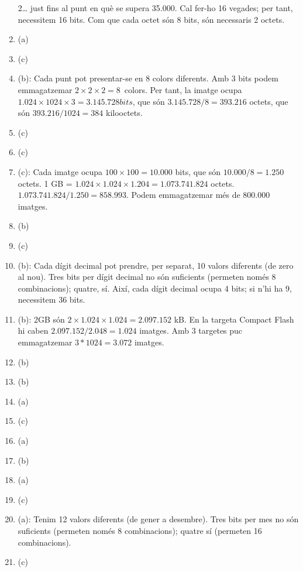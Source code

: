 \begin{enumerate}
  2\times\ldots\) just fins al punt en què se supera 35.000. Cal
  fer-ho 16 vegades; per tant, necessitem 16 bits. Com que cada octet
  són 8 bits, són necessaris 2 octets.
\item (a)
\item (c)
\item (b): Cada punt pot presentar-se en 8 colors diferents. Amb 3
  bits podem emmagatzemar \(2\times2\times2=8\)~colors. Per tant, la
  imatge ocupa $1.024 \times 1024 \times 3 = 3.145.728 bits$, que són
  $3.145.728/8=393.216$ octets, que són $393.216/1024=384$
  kilooctets. 
\item (c)
\item (c)
\item (c): Cada imatge ocupa $100\times100 = 10.000$ bits, que són
  $10.000 / 8 = 1.250$ octets. 1 GB = $1.024 \times 1.024 \times 1.204
  = 1.073.741.824 $ octets. $ 1.073.741.824 / 1.250 = 858.993$. Podem
  emmagatzemar més de 800.000 imatges.
\item (b)
\item (c)
\item (b): Cada dígit decimal pot prendre, per separat, 10 valors
  diferents (de zero al nou). Tres bits per dígit decimal no són
  suficients (permeten només 8 combinacions); quatre, sí. Així, cada
  dígit decimal ocupa 4 bits; si n'hi ha 9, necessitem 36 bits.
\item (b): 2GB són $ 2\times 1.024 \times 1.024 = 2.097.152$ kB. En la
  targeta Compact Flash hi caben $ 2.097.152 / 2.048 = 1.024$
  imatges. Amb 3 targetes puc emmagatzemar $ 3 * 1024 = 3.072$
  imatges.
\item (b)
\item (b)
\item (a)
\item (c)
\item (a)
\item (b)
\item (a)
\item (c)
\item (a): Tenim 12 valors diferents (de gener a desembre). Tres bits
  per mes no són suficients (permeten només 8 combinacions); quatre sí
  (permeten 16 combinacions).
\item (c)
\end{enumerate}
